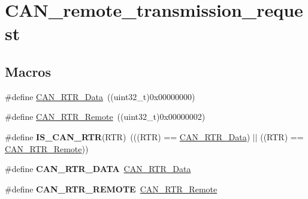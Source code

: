 \hypertarget{group___c_a_n__remote__transmission__request}{\section{C\-A\-N\-\_\-remote\-\_\-transmission\-\_\-request}
\label{group___c_a_n__remote__transmission__request}
}
\subsection*{Macros}
\begin{DoxyCompactItemize}
\item 
\#define \hyperlink{group___c_a_n__remote__transmission__request_ga2407c3a8b2cd97bd651143aa959219f1}{C\-A\-N\-\_\-\-R\-T\-R\-\_\-\-Data}~((uint32\-\_\-t)0x00000000)
\item 
\#define \hyperlink{group___c_a_n__remote__transmission__request_ga42e95ddfb02d88c82de84058fb0fb349}{C\-A\-N\-\_\-\-R\-T\-R\-\_\-\-Remote}~((uint32\-\_\-t)0x00000002)
\item 
\hypertarget{group___c_a_n__remote__transmission__request_ga3379997ad4da6fc4d7975c52b891bdc0}{\#define {\bfseries I\-S\-\_\-\-C\-A\-N\-\_\-\-R\-T\-R}(R\-T\-R)~(((R\-T\-R) == \hyperlink{group___c_a_n__remote__transmission__request_ga2407c3a8b2cd97bd651143aa959219f1}{C\-A\-N\-\_\-\-R\-T\-R\-\_\-\-Data}) $|$$|$ ((R\-T\-R) == \hyperlink{group___c_a_n__remote__transmission__request_ga42e95ddfb02d88c82de84058fb0fb349}{C\-A\-N\-\_\-\-R\-T\-R\-\_\-\-Remote}))}\label{group___c_a_n__remote__transmission__request_ga3379997ad4da6fc4d7975c52b891bdc0}

\item 
\hypertarget{group___c_a_n__remote__transmission__request_gab1e89074b4fcfebf81c323909625b0d0}{\#define {\bfseries C\-A\-N\-\_\-\-R\-T\-R\-\_\-\-D\-A\-T\-A}~\hyperlink{group___c_a_n__remote__transmission__request_ga2407c3a8b2cd97bd651143aa959219f1}{C\-A\-N\-\_\-\-R\-T\-R\-\_\-\-Data}}\label{group___c_a_n__remote__transmission__request_gab1e89074b4fcfebf81c323909625b0d0}

\item 
\hypertarget{group___c_a_n__remote__transmission__request_gab15c649e3e497c6d1145bb98ff7f3f04}{\#define {\bfseries C\-A\-N\-\_\-\-R\-T\-R\-\_\-\-R\-E\-M\-O\-T\-E}~\hyperlink{group___c_a_n__remote__transmission__request_ga42e95ddfb02d88c82de84058fb0fb349}{C\-A\-N\-\_\-\-R\-T\-R\-\_\-\-Remote}}\label{group___c_a_n__remote__transmission__request_gab15c649e3e497c6d1145bb98ff7f3f04}

\end{DoxyCompactItemize}


